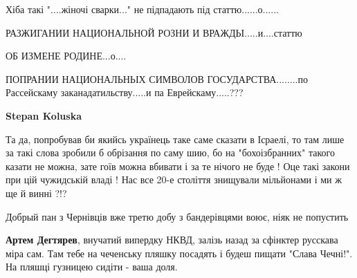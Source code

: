 \begin{itemize}
\begin{itemize}
\begin{itemize}
\end{itemize}

 

Хіба такі "....жіночі сварки..." не підпадають під статтю......о......

РАЗЖИГАНИИ НАЦИОНАЛЬНОЙ РОЗНИ И ВРАЖДЬІ.....и....статтю

ОБ ИЗМЕНЕ РОДИНЕ...о....

ПОПРАНИИ НАЦИОНАЛЬНЬІХ СИМВОЛОВ ГОСУДАРСТВА........по Рассейскаму
заканадатильству.....и па Еврейскаму.....???

\begin{itemize}
 
\textbf{Stepan Koluska} 

Та да, попробував би якийсь українець таке саме сказати в Ісраелі, то там лише
за такі слова зробили б обрізання по саму шию, бо на "бохоізбранних" такого
казати не можна, зате гоїв можна вбивати і за те нічого не буде ! Оце такі
закони при цій чужидській владі ! Нас все 20-е століття знищували мільйонами і
ми ж ще й винні ?!?
\end{itemize}

 
Добрый пан з Чернівців вже третю добу з бандерівцями воює, ніяк не попустить

 

\textbf{Артем Дегтярев}, внучатий випердку НКВД, залізь назад за сфінктер
русскава міра сам. Там тебе на чеченську пляшку посадять і будеш пищати "Слава
Чечні!". На пляшці гузницею сидіти - ваша доля.


\end{itemize}
\end{itemize}
